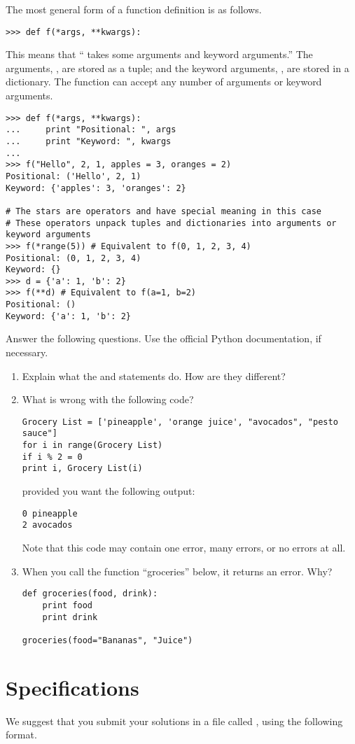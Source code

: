 The most general form of a function definition is as follows.
\begin{lstlisting}
>>> def f(*args, **kwargs):
\end{lstlisting}
This means that `` takes some arguments and keyword arguments.''
The arguments, , are stored as a tuple; and the keyword arguments, , are stored in a dictionary.
The function  can accept any number of arguments or keyword arguments.
\begin{lstlisting}
>>> def f(*args, **kwargs):
...     print "Positional: ", args
...     print "Keyword: ", kwargs
...     
>>> f("Hello", 2, 1, apples = 3, oranges = 2)
Positional: ('Hello', 2, 1)
Keyword: {'apples': 3, 'oranges': 2}

# The stars are operators and have special meaning in this case
# These operators unpack tuples and dictionaries into arguments or keyword arguments
>>> f(*range(5)) # Equivalent to f(0, 1, 2, 3, 4)
Positional: (0, 1, 2, 3, 4)
Keyword: {}
>>> d = {'a': 1, 'b': 2}
>>> f(**d) # Equivalent to f(a=1, b=2)
Positional: ()
Keyword: {'a': 1, 'b': 2}
\end{lstlisting}

\begin{problem}
Answer the following questions. Use the official Python documentation, if necessary.

\begin{enumerate}
\item Explain what the  and  statements do. How are they different?
\item What is wrong with the following code?
\begin{lstlisting}
Grocery List = ['pineapple', 'orange juice', "avocados", "pesto sauce"]
for i in range(Grocery List)
if i % 2 = 0
print i, Grocery List(i)
\end{lstlisting}
provided you want the following output:
\begin{lstlisting}
0 pineapple
2 avocados
\end{lstlisting}
Note that this code may contain one error, many errors, or no errors at all.
\item When you call the function ``groceries'' below, it returns an error. Why?
\begin{lstlisting}
def groceries(food, drink):
    print food
    print drink    

groceries(food="Bananas", "Juice")
\end{lstlisting}
\end{enumerate}
\end{problem}



\section*{Specifications}
We suggest that you submit your solutions in a file called , using the following format.

